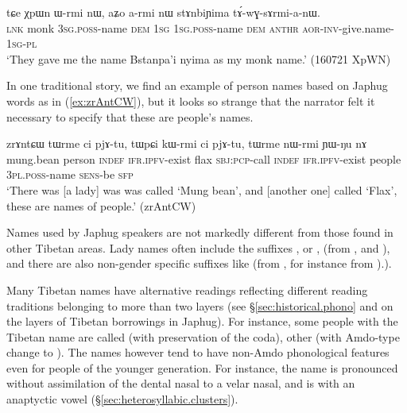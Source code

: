 \begin{exe}
\ex \label{ex:XpWn.Wrmi}
\gll tɕe χpɯn ɯ-rmi nɯ, aʑo a-rmi nɯ stɤnbiɲima tɤ́-wɣ-sɤrmi-a-nɯ. \\
\textsc{lnk} monk \textsc{3sg}.\textsc{poss}-name \textsc{dem} \textsc{1sg} \textsc{1sg}.\textsc{poss}-name \textsc{dem} \textsc{anthr} \textsc{aor}-\textsc{inv}-give.name-\textsc{1sg}-\textsc{pl} \\
\glt `They gave me the name Bstanpa'i nyima as my monk name.' (160721 XpWN)
\end{exe}

In one traditional story, we find an example of person names based on Japhug words as in (\ref{ex:zrAntCW}), but it looks so strange that the narrator felt it necessary to specify that these are people's names.

\begin{exe}
\ex \label{ex:zrAntCW}
 \gll zrɤntɕɯ tɯrme ci pjɤ-tu, tɯpɕi kɯ-rmi ci pjɤ-tu, tɯrme nɯ-rmi ɲɯ-ŋu nɤ \\
mung.bean person \textsc{indef} \textsc{ifr}.\textsc{ipfv}-exist flax \textsc{sbj}:\textsc{pcp}-call \textsc{indef} \textsc{ifr}.\textsc{ipfv}-exist people \textsc{3pl}.\textsc{poss}-name \textsc{sens}-be \textsc{sfp} \\
\glt `There was [a lady] was was called `Mung bean', and [another one] called `Flax', these are names of people.' (zrAntCW)
\end{exe}

Names used by Japhug speakers are not markedly different from those found in other Tibetan areas. Lady names often include the suffixes ,  or , (from ,  and ), and there are also non-gender specific suffixes like  (from , for instance  from ).). 

Many Tibetan names have alternative readings reflecting different reading traditions belonging to more than two layers (see §\ref{sec:historical.phono} and \citealt[83--200]{jacques04these} on the layers of Tibetan borrowings in Japhug). For instance, some people with the Tibetan name  are called  (with preservation of the coda), other  (with Amdo-type change to ). The names however tend to have non-Amdo phonological features even for people of the younger generation. For instance, the name  is pronounced  without assimilation of the dental nasal to a velar nasal, and  is  with an anaptyctic vowel (§\ref{sec:heterosyllabic.clusters}). 

